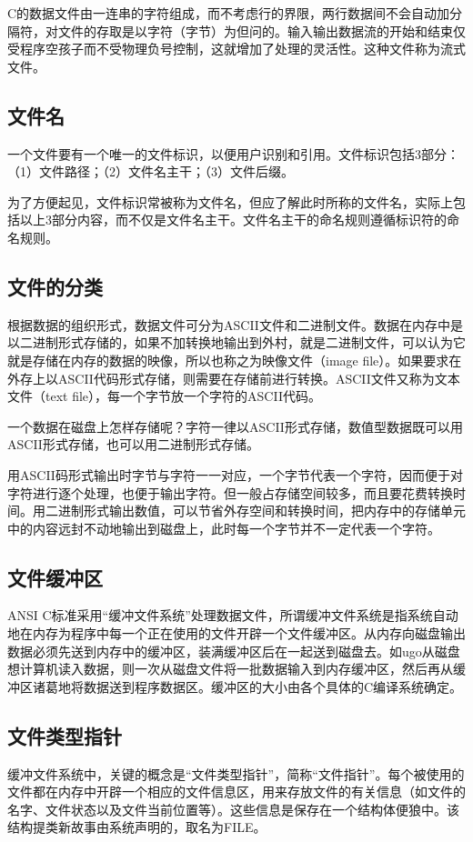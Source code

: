 C的数据文件由一连串的字符组成，而不考虑行的界限，两行数据间不会自动加分隔符，对文件的存取是以字符（字节）为但问的。输入输出数据流的开始和结束仅受程序空孩子而不受物理负号控制，这就增加了处理的灵活性。这种文件称为流式文件。
\subsection{文件名}
一个文件要有一个唯一的文件标识，以便用户识别和引用。文件标识包括3部分：（1）文件路径；（2）文件名主干；（3）文件后缀。

为了方便起见，文件标识常被称为文件名，但应了解此时所称的文件名，实际上包括以上3部分内容，而不仅是文件名主干。文件名主干的命名规则遵循标识符的命名规则。
\subsection{文件的分类}
根据数据的组织形式，数据文件可分为ASCII文件和二进制文件。数据在内存中是以二进制形式存储的，如果不加转换地输出到外村，就是二进制文件，可以认为它就是存储在内存的数据的映像，所以也称之为映像文件（image file）。如果要求在外存上以ASCII代码形式存储，则需要在存储前进行转换。ASCII文件又称为文本文件（text file），每一个字节放一个字符的ASCII代码。

一个数据在磁盘上怎样存储呢？字符一律以ASCII形式存储，数值型数据既可以用ASCII形式存储，也可以用二进制形式存储。

用ASCII码形式输出时字节与字符一一对应，一个字节代表一个字符，因而便于对字符进行逐个处理，也便于输出字符。但一般占存储空间较多，而且要花费转换时间。用二进制形式输出数值，可以节省外存空间和转换时间，把内存中的存储单元中的内容远封不动地输出到磁盘上，此时每一个字节并不一定代表一个字符。

\subsection{文件缓冲区}
ANSI C标准采用“缓冲文件系统”处理数据文件，所谓缓冲文件系统是指系统自动地在内存为程序中每一个正在使用的文件开辟一个文件缓冲区。从内存向磁盘输出数据必须先送到内存中的缓冲区，装满缓冲区后在一起送到磁盘去。如ugo从磁盘想计算机读入数据，则一次从磁盘文件将一批数据输入到内存缓冲区，然后再从缓冲区诸葛地将数据送到程序数据区。缓冲区的大小由各个具体的C编译系统确定。
\subsection{文件类型指针}
缓冲文件系统中，关键的概念是“文件类型指针”，简称“文件指针”。每个被使用的文件都在内存中开辟一个相应的文件信息区，用来存放文件的有关信息（如文件的名字、文件状态以及文件当前位置等）。这些信息是保存在一个结构体便狼中。该结构提类新故事由系统声明的，取名为FILE。

